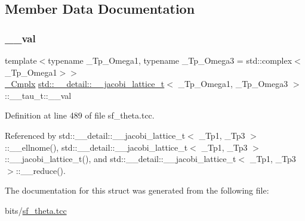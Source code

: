 \subsection{Member Data Documentation}
\mbox{\label{structstd_1_1____detail_1_1____jacobi__lattice__t_1_1____tau__t_a00e3e1dca58683668fd457120f83e736}} 
\subsubsection{\texorpdfstring{\+\_\+\+\_\+val}{\_\_val}}
{\footnotesize\ttfamily template$<$typename \+\_\+\+Tp\+\_\+\+Omega1, typename \+\_\+\+Tp\+\_\+\+Omega3 = std\+::complex$<$\+\_\+\+Tp\+\_\+\+Omega1$>$$>$ \\
\hyperlink{structstd_1_1____detail_1_1____jacobi__lattice__t_a77e286c37544d6ba5e4fb5542d3aad5f}{\+\_\+\+Cmplx} \hyperlink{structstd_1_1____detail_1_1____jacobi__lattice__t}{std\+::\+\_\+\+\_\+detail\+::\+\_\+\+\_\+jacobi\+\_\+lattice\+\_\+t}$<$ \+\_\+\+Tp\+\_\+\+Omega1, \+\_\+\+Tp\+\_\+\+Omega3 $>$\+::\+\_\+\+\_\+tau\+\_\+t\+::\+\_\+\+\_\+val}



Definition at line 489 of file sf\+\_\+theta.\+tcc.



Referenced by std\+::\+\_\+\+\_\+detail\+::\+\_\+\+\_\+jacobi\+\_\+lattice\+\_\+t$<$ \+\_\+\+Tp1, \+\_\+\+Tp3 $>$\+::\+\_\+\+\_\+ellnome(), std\+::\+\_\+\+\_\+detail\+::\+\_\+\+\_\+jacobi\+\_\+lattice\+\_\+t$<$ \+\_\+\+Tp1, \+\_\+\+Tp3 $>$\+::\+\_\+\+\_\+jacobi\+\_\+lattice\+\_\+t(), and std\+::\+\_\+\+\_\+detail\+::\+\_\+\+\_\+jacobi\+\_\+lattice\+\_\+t$<$ \+\_\+\+Tp1, \+\_\+\+Tp3 $>$\+::\+\_\+\+\_\+reduce().



The documentation for this struct was generated from the following file\+:\begin{DoxyCompactItemize}
\item 
bits/\hyperlink{sf__theta_8tcc}{sf\+\_\+theta.\+tcc}\end{DoxyCompactItemize}
